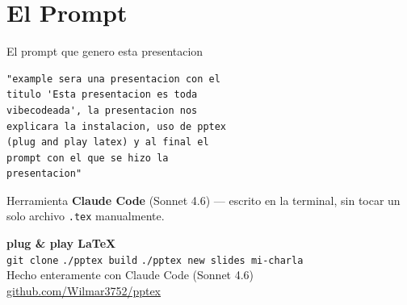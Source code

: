\section{El Prompt}

\begin{frame}[fragile]{El prompt que genero esta presentacion}

  \begin{lstlisting}[basicstyle=\ttfamily\small, breaklines=true]
"example sera una presentacion con el
titulo 'Esta presentacion es toda
vibecodeada', la presentacion nos
explicara la instalacion, uso de pptex
(plug and play latex) y al final el
prompt con el que se hizo la
presentacion"
  \end{lstlisting}

  \vspace{0.6em}
  \begin{exampleblock}{Herramienta}
    \textbf{Claude Code} (Sonnet 4.6) — escrito en la terminal,
    sin tocar un solo archivo \texttt{.tex} manualmente.
  \end{exampleblock}
\end{frame}


{
\begin{frame}[plain]
  \centering
  \vspace{2.5em}
  {\LARGE\color{white}\textbf{plug \& play LaTeX}}\\[1em]
  {\normalsize\color{white!80}
    \texttt{git clone} \quad \texttt{./pptex build} \quad \texttt{./pptex new slides mi-charla}
  }\\[2em]
  {\small\color{white!60}
    Hecho enteramente con Claude Code (Sonnet 4.6)\\[0.3em]
    \url{github.com/Wilmar3752/pptex}
  }
\end{frame}
}
